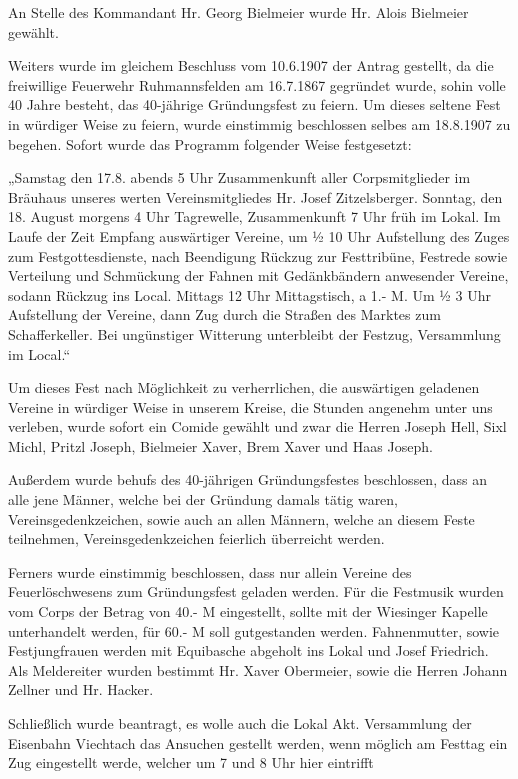 An Stelle des Kommandant Hr. Georg Bielmeier wurde Hr. Alois Bielmeier gewählt.

Weiters wurde im gleichem Beschluss vom 10.6.1907 der Antrag gestellt, da die
freiwillige Feuerwehr Ruhmannsfelden am 16.7.1867 gegründet wurde, sohin volle
40 Jahre besteht, das 40-jährige Gründungsfest zu feiern. Um dieses seltene Fest
in würdiger Weise zu feiern, wurde einstimmig beschlossen selbes am 18.8.1907 zu
begehen. Sofort wurde das Programm folgender Weise festgesetzt:

„Samstag den 17.8. abends 5 Uhr Zusammenkunft aller Corpsmitglieder im Bräuhaus
unseres werten Vereinsmitgliedes Hr. Josef Zitzelsberger. Sonntag, den 18.
August morgens 4 Uhr Tagrewelle, Zusammenkunft 7 Uhr früh im Lokal. Im Laufe der
Zeit Empfang auswärtiger Vereine, um ½ 10 Uhr Aufstellung des Zuges zum
Festgottesdienste, nach Beendigung Rückzug zur Festtribüne, Festrede sowie
Verteilung und Schmückung der Fahnen mit Gedänkbändern anwesender Vereine,
sodann Rückzug ins Local. Mittags 12 Uhr Mittagstisch, a 1.- M. Um ½ 3 Uhr
Aufstellung der Vereine, dann Zug durch die Straßen des Marktes zum
Schafferkeller. Bei ungünstiger Witterung unterbleibt der Festzug, Versammlung
im Local.“

Um dieses Fest nach Möglichkeit zu verherrlichen, die auswärtigen geladenen
Vereine in würdiger Weise in unserem Kreise, die Stunden angenehm unter uns
verleben, wurde sofort ein Comide gewählt und zwar die Herren Joseph Hell, Sixl
Michl, Pritzl Joseph, Bielmeier Xaver, Brem Xaver und Haas Joseph.

Außerdem wurde behufs des 40-jährigen Gründungsfestes beschlossen, dass an alle
jene Männer, welche bei der Gründung damals tätig waren, Vereinsgedenkzeichen,
sowie auch an allen Männern, welche an diesem Feste teilnehmen,
Vereinsgedenkzeichen feierlich überreicht werden.

Ferners wurde einstimmig beschlossen, dass nur allein Vereine des
Feuerlöschwesens zum Gründungsfest geladen werden. Für die Festmusik wurden vom
Corps der Betrag von 40.- M eingestellt, sollte mit der Wiesinger Kapelle
unterhandelt werden, für 60.- M soll gutgestanden werden. Fahnenmutter, sowie
Festjungfrauen werden mit Equibasche abgeholt ins Lokal und Josef Friedrich. Als
Meldereiter wurden bestimmt Hr. Xaver Obermeier, sowie die Herren Johann Zellner
und Hr. Hacker.

Schließlich wurde beantragt, es wolle auch die Lokal Akt. Versammlung der
Eisenbahn Viechtach das Ansuchen gestellt werden, wenn möglich am Festtag ein
Zug eingestellt werde, welcher um 7 und 8 Uhr hier eintrifft



